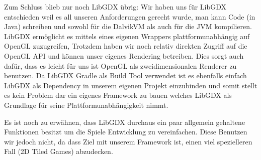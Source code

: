 Zum Schluss blieb nur noch LibGDX übrig:
Wir haben uns für LibGDX entschieden weil es all unseren Anforderungen gerecht wurde, man kann Code (in Java) schreiben und sowohl für die DalvikVM als auch für die JVM kompilieren. LibGDX ermöglicht es mittels eines eigenen Wrappers plattformunabhängig auf OpenGL zuzugreifen, Trotzdem haben wir noch relativ direkten Zugriff auf die OpenGL API und können unser eigenes Rendering betreiben. Dies sorgt auch dafür, dass es leicht für uns ist OpenGL als zweidimensionalen Renderer zu benutzen.
Da LibGDX Gradle als Build Tool verwendet ist es ebenfalls einfach LibGDX als Dependency in unserem eigenen Projekt einzubinden und somit stellt es kein Problem dar ein eigenes Framework zu bauen welches LibGDX als Grundlage für seine Plattformunabhängigkeit nimmt.

Es ist noch zu erwähnen, dass LibGDX durchaus ein paar allgemein gehaltene Funktionen besitzt um die Spiele Entwicklung zu vereinfachen. Diese Benutzen wir jedoch nicht, da dass Ziel mit unserem Framework ist, einen viel spezielleren Fall (2D Tiled Games) abzudecken.